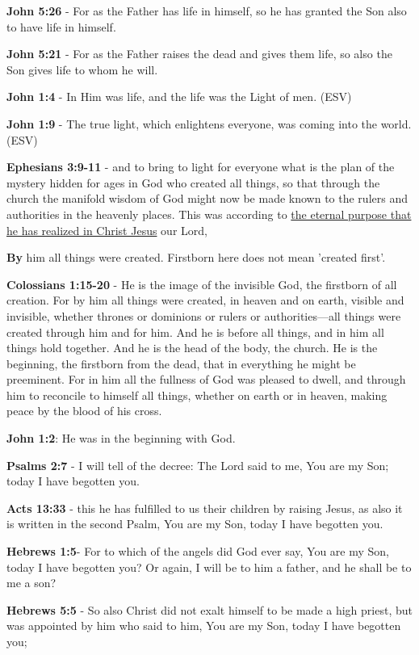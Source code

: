 \documentclass[11pt]{article}
\begin{document}
\textbf{John 5:26} - For as the Father has life in himself, so he has granted the Son also to have life in himself.

\textbf{John 5:21} - For as the Father raises the dead and gives them life, so also the Son gives life to whom he will.

\textbf{John 1:4} - In Him was life, and the life was the Light of men. (ESV)

\textbf{John 1:9} - The true light, which enlightens everyone, was coming into the world. (ESV)

\textbf{Ephesians 3:9-11} - and to bring to light for everyone what is the plan of the mystery hidden for ages in God who created all things, so that through the church the manifold wisdom of God might now be made known to the rulers and authorities in the heavenly places. This was according to \uline{the eternal purpose that he has realized in Christ Jesus} our Lord,

\textbf{By} him all things were created. Firstborn here does not mean 'created first'.

\textbf{Colossians 1:15-20} - He is the image of the invisible God, the firstborn of all creation. For by him all things were created, in heaven and on earth, visible and invisible, whether thrones or dominions or rulers or authorities—all things were created through him and for him. And he is before all things, and in him all things hold together. And he is the head of the body, the church. He is the beginning, the firstborn from the dead, that in everything he might be preeminent. For in him all the fullness of God was pleased to dwell, and through him to reconcile to himself all things, whether on earth or in heaven, making peace by the blood of his cross.

\textbf{John 1:2}: He was in the beginning with God.

\textbf{Psalms 2:7} - I will tell of the decree: The Lord said to me, You are my Son; today I have begotten you.

\textbf{Acts 13:33} - this he has fulfilled to us their children by raising Jesus, as also it is written in the second Psalm, You are my Son, today I have begotten you.

\textbf{Hebrews 1:5}- For to which of the angels did God ever say, You are my Son, today I have begotten you? Or again, I will be to him a father, and he shall be to me a son?

\textbf{Hebrews 5:5} - So also Christ did not exalt himself to be made a high priest, but was appointed by him who said to him, You are my Son, today I have begotten you;
\end{document}

